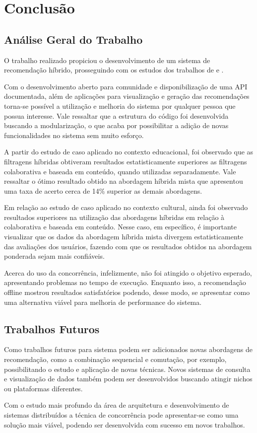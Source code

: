 \chapter{\textbf{Conclusão}} %

\section{Análise Geral do Trabalho}

O trabalho realizado propiciou o desenvolvimento de um sistema de recomendação híbrido, prosseguindo com os estudos dos trabalhos de  e .

Com o desenvolvimento aberto para comunidade e disponibilização de uma API documentada, além de aplicações para visualização e geração das recomendações torna-se possível a utilização e melhoria do sistema por qualquer pessoa que possua interesse. Vale ressaltar que a estrutura do código foi desenvolvida buscando a modularização, o que acaba por possibilitar a adição de novas funcionalidades no sistema sem muito esforço.

A partir do estudo de caso aplicado no contexto educacional, foi observado que as filtragens híbridas obtiveram resultados estatisticamente superiores as filtragens colaborativa e baseada em conteúdo, quando utilizadas separadamente. Vale ressaltar o ótimo resultado obtido na abordagem híbrida mista que apresentou uma taxa de acerto cerca de 14\% superior as demais abordagens.

Em relação ao estudo de caso aplicado no contexto cultural, ainda foi observado resultados superiores na utilização das abordagens híbridas em relação à colaborativa e baseada em conteúdo. Nesse caso, em específico, é importante visualizar que os dados da abordagem híbrida mista divergem estatisticamente das avaliações dos usuários, fazendo com que os resultados obtidos na abordagem ponderada sejam mais confiáveis.

Acerca do uso da concorrência, infelizmente, não foi atingido o objetivo esperado, apresentando problemas no tempo de execução. Enquanto isso, a recomendação offline mostrou resultados satisfatórios podendo, desse modo, se apresentar como uma alternativa viável para melhoria de performance do sistema. 

\section{Trabalhos Futuros}

Como trabalhos futuros para sistema podem ser adicionados novas abordagens de recomendação, como a combinação sequencial e comutação, por exemplo, possibilitando o estudo e aplicação de novas técnicas. Novos sistemas de consulta e visualização de dados também podem ser desenvolvidos buscando atingir nichos ou plataformas diferentes.

Com o estudo mais profundo da área de arquitetura e desenvolvimento de sistemas distribuídos a técnica de concorrência pode apresentar-se como uma solução mais viável, podendo ser desenvolvida com sucesso em novos trabalhos.